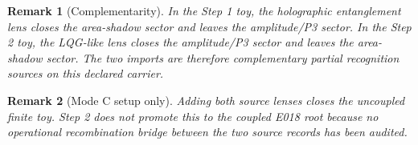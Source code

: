 \documentclass[11pt]{article}
\newtheorem{remark}{Remark}
\begin{document}
\begin{remark}[Complementarity]
In the Step 1 toy, the holographic entanglement lens closes the area-shadow
sector and leaves the amplitude/P3 sector.  In the Step 2 toy, the LQG-like
lens closes the amplitude/P3 sector and leaves the area-shadow sector.  The
two imports are therefore complementary partial recognition sources on this
declared carrier.
\end{remark}

\begin{remark}[Mode C setup only]
Adding both source lenses closes the uncoupled finite toy.  Step 2 does not
promote this to the coupled E018 root because no operational recombination
bridge between the two source records has been audited.
\end{remark}
\end{document}

